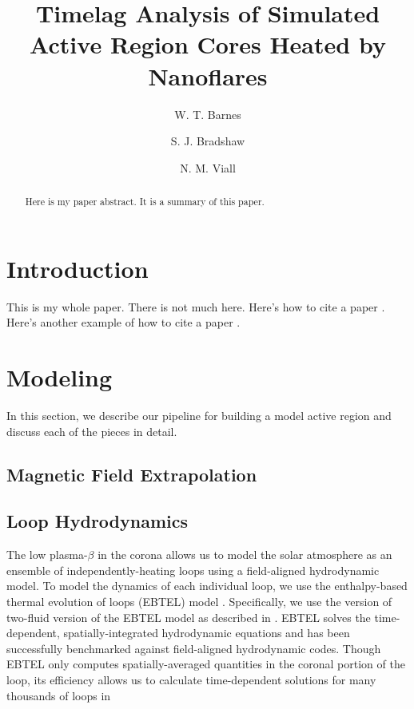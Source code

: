 \documentclass[modern,linenumbers]{aastex62}
\begin{document}
\title{Timelag Analysis of Simulated Active Region Cores Heated by Nanoflares}

\author[0000-0001-9642-6089]{W. T. Barnes}
\author{S. J. Bradshaw}
\author{N. M. Viall}

\begin{abstract}
Here is my paper abstract. It is a summary of this paper.
\end{abstract}



\section{Introduction}\label{introduction}

This is my whole paper. There is not much here. Here's how to cite a
paper \citet{viall_evidence_2012}. Here's another example of how to cite
a paper \citep{warren_constraints_2011}.


\section{Modeling}
\label{modeling}
In this section, we describe our pipeline for building a model active region and discuss each of the pieces in detail.

\subsection{Magnetic Field Extrapolation}
\label{field}

\subsection{Loop Hydrodynamics}
\label{loops}
The low plasma-$\beta$ in the corona allows us to model the solar atmosphere as an ensemble of independently-heating loops using a field-aligned hydrodynamic model. To model the dynamics of each individual loop, we use the enthalpy-based thermal evolution of loops (EBTEL) model \citep{klimchuk_highly_2008,cargill_enthalpy-based_2012}. Specifically, we use the version of two-fluid version of the EBTEL model as described in \citep{barnes_inference_2016}. EBTEL solves the time-dependent, spatially-integrated hydrodynamic equations and has been successfully benchmarked against field-aligned hydrodynamic codes. Though EBTEL only computes spatially-averaged quantities in the coronal portion of the loop, its efficiency allows us to calculate time-dependent solutions for many thousands of loops in 
\end{document}
